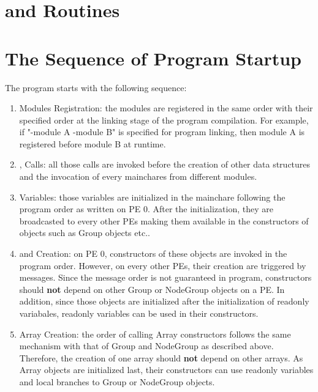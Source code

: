 \section{ and  Routines}


\section{The Sequence of \charmpp{} Program Startup}


The \charmpp{} program starts with the following sequence:
\begin{enumerate}
\item Modules Registration: the modules are registered in the same order with
their specified order at the linking stage of the program compilation.
For example, if "-module A -module B" is specified for \charmpp{} program
linking, then module A is registered before module B at runtime.

\item {}, Calls: all those calls are invoked before the
creation of other \charmpp{} data structures and the invocation of every
mainchares from different modules.

\item {} Variables: those variables are initialized in the mainchare following the program order as written on PE 0. After the initialization, they
are broadcasted to every other PEs making them available in the constructors
of \charmpp{} objects such as Group objects etc..

\item {} and  Creation: on PE 0, constructors of these
objects are invoked in the program order. However, on every other PEs, their
creation are triggered by messages. Since the message order is not guaranteed
in \charmpp{} program, constructors should \textbf{not} depend on other Group
or NodeGroup objects on a PE. In addition, since those objects are initialized
after the initialization of readonly variabales, readonly variables can be used
in their constructors.

\item \charmpp{} Array Creation: the order of calling Array constructors follows
the same mechanism with that of Group and NodeGroup as described above.
Therefore, the creation of one array should \textbf{not} depend on other arrays.
As Array objects are initialized last, their constructors can use 
readonly variables and local branches to Group or NodeGroup objects.
\end{enumerate}
